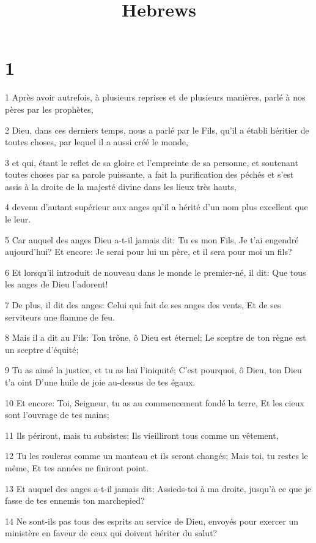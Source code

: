 

\title{Hebrews}


\chapter{1}

\par 1 Après avoir autrefois, à plusieurs reprises et de plusieurs manières, parlé à nos pères par les prophètes,
\par 2 Dieu, dans ces derniers temps, nous a parlé par le Fils, qu'il a établi héritier de toutes choses, par lequel il a aussi créé le monde,
\par 3 et qui, étant le reflet de sa gloire et l'empreinte de sa personne, et soutenant toutes choses par sa parole puissante, a fait la purification des péchés et s'est assis à la droite de la majesté divine dans les lieux très hauts,
\par 4 devenu d'autant supérieur aux anges qu'il a hérité d'un nom plus excellent que le leur.
\par 5 Car auquel des anges Dieu a-t-il jamais dit: Tu es mon Fils, Je t'ai engendré aujourd'hui? Et encore: Je serai pour lui un père, et il sera pour moi un fils?
\par 6 Et lorsqu'il introduit de nouveau dans le monde le premier-né, il dit: Que tous les anges de Dieu l'adorent!
\par 7 De plus, il dit des anges: Celui qui fait de ses anges des vents, Et de ses serviteurs une flamme de feu.
\par 8 Mais il a dit au Fils: Ton trône, ô Dieu est éternel; Le sceptre de ton règne est un sceptre d'équité;
\par 9 Tu as aimé la justice, et tu as haï l'iniquité; C'est pourquoi, ô Dieu, ton Dieu t'a oint D'une huile de joie au-dessus de tes égaux.
\par 10 Et encore: Toi, Seigneur, tu as au commencement fondé la terre, Et les cieux sont l'ouvrage de tes mains;
\par 11 Ils périront, mais tu subsistes; Ils vieilliront tous comme un vêtement,
\par 12 Tu les rouleras comme un manteau et ils seront changés; Mais toi, tu restes le même, Et tes années ne finiront point.
\par 13 Et auquel des anges a-t-il jamais dit: Assieds-toi à ma droite, jusqu'à ce que je fasse de tes ennemis ton marchepied?
\par 14 Ne sont-ils pas tous des esprits au service de Dieu, envoyés pour exercer un ministère en faveur de ceux qui doivent hériter du salut?

